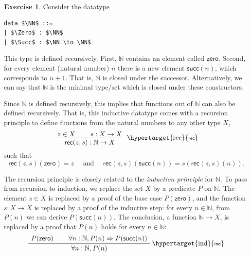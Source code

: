 \documentclass[a4paper,11pt, oneside,titlepage=false]{scrbook}
\newcommand{\proofskip}{0.5em}
\newcommand{\rulelabel}[1]{\hypertarget{#1}{\textsf{\scriptsize #1}}}
\newenvironment{bproof}
{\leavevmode\hbox\bgroup}
{\DisplayProof\egroup}
\newcommand{\binaryRule}[4]{\begin{bproof}
\AxiomC{\ensuremath{#1}}
\AxiomC{\ensuremath{#2}}
\RightLabel{\rulelabel{#4}}
\BinaryInfC{\ensuremath{#3}}
\end{bproof}\vspace{\proofskip}}
\theoremstyle{plain}
\theoremstyle{definition}
\newtheorem{exer}[thm]{Exercise}
\newcommand{\rec}{\ensuremath{\mathsf{rec}}}
\newcommand{\NN}{\ensuremath{\mathbb{N}}}
\newcommand{\Zero}{\ensuremath{\mathsf{zero}}}
\newcommand{\Succ}{\ensuremath{\mathsf{succ}}}
\begin{document}
\begin{exer}\label{exer:nat-initial}
  Consider the datatype
\begin{lstlisting}[mathescape=true]
data $\NN$ ::=
| $\Zero$ : $\NN$
| $\Succ$ : $\NN \to \NN$
\end{lstlisting}
%
%
This type is defined recursively.
First, $\NN$ contains an element called $\Zero$.
Second, for every element (natural number) $n$ there is a new element $\Succ(n)$, which corresponds to $n + 1$.
That is, $\NN$ is closed under the successor.
Alternatively, we can say that $\NN$ is the minimal type/set which is closed under these constructors.

Since $\NN$ is defined recursively, this implies that functions out of $\NN$ can also be defined recursively.
That is, this inductive datatype comes with a recursion principle to define functions from the natural numbers to any other type $X$,
\[
  \binaryRule
  {z \in X}
  {s : X \to X}
  {\rec(z,s) : \NN \to X}
  {rec}
\]
such that
\begin{equation}\label{eq:computation-rules-nat}
  \rec(z,s)(\Zero) = z \quad\text{ and }\quad \rec(z,s)(\Succ(n)) = s (\rec(z,s)(n)).
\end{equation}

The recursion principle is closely related to the \emph{induction principle} for $\NN$.
To pass from recursion to induction, we replace the set $X$ by a predicate $P$ on $\NN$.
The element $z \in X$ is replaced by a proof of the base case $P(\Zero)$, and the
function $s : X \to X$ is replaced by a proof of the inductive step: for every
$n \in \NN$, from $P(n)$ we can derive $P(\Succ(n))$.
The conclusion, a function $\NN \to X$, is replaced by a proof that $P(n)$ holds
for every $n \in \NN$:
\[
  \binaryRule
  {P(\Zero)}
  {\forall n : \NN, P(n) \Rightarrow P(\Succ (n))}
  {\forall n : \NN, P(n)}
  {ind}
\]


\end{exer}
\end{document}
